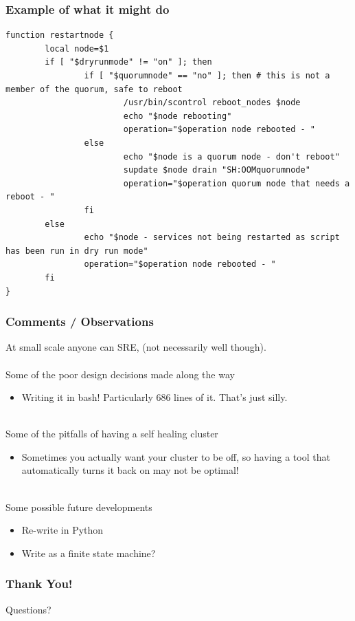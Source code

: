 \documentclass{beamer}
\begin{document}
\begin{frame}[fragile]
\frametitle{Example of what it might do}
\begin{lstlisting}[basicstyle=\tiny,]
function restartnode {
        local node=$1
        if [ "$dryrunmode" != "on" ]; then
                if [ "$quorumnode" == "no" ]; then # this is not a member of the quorum, safe to reboot
                        /usr/bin/scontrol reboot_nodes $node
                        echo "$node rebooting"
                        operation="$operation node rebooted - "
                else 
                        echo "$node is a quorum node - don't reboot"
                        supdate $node drain "SH:OOMquorumnode"
                        operation="$operation quorum node that needs a reboot - "
                fi
        else
                echo "$node - services not being restarted as script has been run in dry run mode"
                operation="$operation node rebooted - "
        fi
}
\end{lstlisting}
\end{frame}

\begin{frame}
\frametitle{Comments / Observations}
At small scale anyone can SRE, (not necessarily well though).\\~\\
Some of the poor design decisions made along the way
\begin{itemize}
	\item Writing it in bash! Particularly 686 lines of it. That’s just silly.\\~\\
\end{itemize}
Some of the pitfalls of having a self healing cluster
\begin{itemize}
	\item Sometimes you actually want your cluster to be off, so having a tool that automatically turns it back on may not be optimal!\\~\\
\end{itemize}
Some possible future developments
\begin{itemize}
	\item Re-write in Python
	\item Write as a finite state machine?
\end{itemize}
\end{frame}

\begin{frame}
\frametitle{Thank You!}
\begin{center}
	Questions?
\end{center}
\end{frame}
\end{document}

